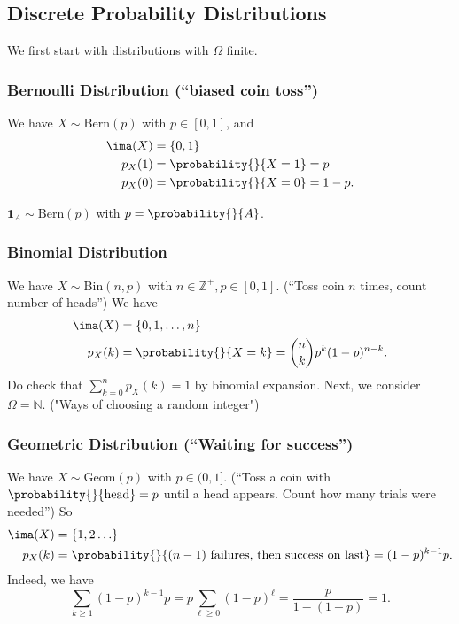 \subsection{Discrete Probability Distributions}
We first start with distributions with \(\Omega\) finite.
\subsubsection{Bernoulli Distribution (``biased coin toss'')}
We have \(X \sim \mathrm{Bern}(p)\) with \(p \in [0,1]\), and
\begin{align*}
    \ima(X) &= \{0,1\}\\
    p_X(1) &= \probability{}{X = 1} = p\\
    p_X(0) &= \probability{}{X = 0} = 1-p.
\end{align*}
\begin{example}
    \(\textbf{1}_A \sim \mathrm{Bern}(p)\) with \(p = \probability{}{A}\).
\end{example}
\subsubsection{Binomial Distribution}
We have \(X \sim \mathrm{Bin}(n,p)\) with \(n \in \mathbb{Z}^+, p \in [0,1]\). (``Toss coin \(n\) times, count number of heads'') We have
\begin{align*}
    \ima(X) &= \{0,1, \ldots, n\}\\
    p_X(k) &= \probability{}{X = k} = \binom{n}{k}p^k (1-p)^{n-k}.
\end{align*}
Do check that \(\sum\limits_{k=0}^{n} p_X(k) = 1\) by binomial expansion.
Next, we consider \(\Omega=\mathbb{N}\). ("Ways of choosing a random integer")
\subsubsection{Geometric Distribution (``Waiting for success'')}
We have \(X \sim \mathrm{Geom}(p)\) with \(p \in (0,1]\). (``Toss a coin with \(\probability{}{\text{head}} =p\) until a head appears. Count how many trials were needed'') So
\begin{align*}
    \ima(X) &= \{1,2 \ldots\}\\
    p_X(k) &= \probability{}{(n-1)\text{ failures, then success on last}} = (1-p)^{k-1}p. 
\end{align*}
Indeed, we have
\[
    \sum\limits_{k\geq 1}(1-p)^{k-1}p = p \sum_{\ell\geq 0}(1-p)^\ell = \frac{p}{1 - (1-p)} = 1.
\]

